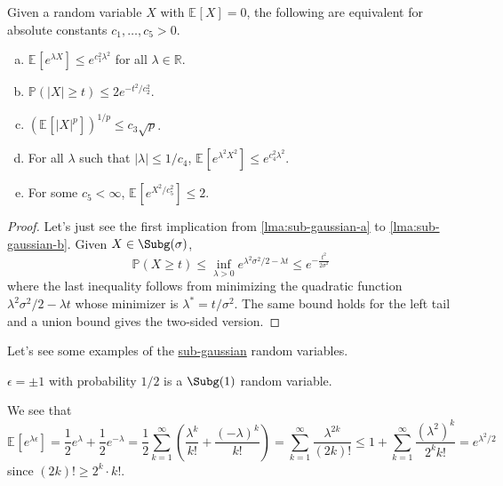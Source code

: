 \begin{lemma}\label{lma:sub-gaussian}
  Given a random variable \(X\) with \(\mathbb{E}_{}\left[X \right] =0\), the following are equivalent for absolute constants \(c_1, \dots , c_5 > 0\).
  \begin{enumerate}[(a)]
    \item\label{lma:sub-gaussian-a} \(\mathbb{E}_{}\left[e^{\lambda X} \right] \leq e^{c_1^2 \lambda ^2}\) for all \(\lambda \in \mathbb{R} \).
    \item\label{lma:sub-gaussian-b} \(\mathbb{P} (\vert X \vert \geq t) \leq 2 e^{- t^2 / c_2^2}\).
    \item\label{lma:sub-gaussian-c} \(\left( \mathbb{E}_{}\left[\vert X \vert ^p \right]  \right)^{1 / p} \leq c_3 \sqrt{p}  \).
    \item\label{lma:sub-gaussian-d} For all \(\lambda \) such that \(\vert \lambda  \vert \leq 1 / c_4 \), \(\mathbb{E}_{}\left[e^{\lambda ^2 X^2} \right] \leq e^{c_4^2 \lambda ^2} \).
    \item\label{lma:sub-gaussian-e} For some \(c_5 < \infty \), \(\mathbb{E}_{}\left[e^{X^2 / c_5^2}  \right] \leq 2\).
  \end{enumerate}
\end{lemma}
\begin{proof}
  Let's just see the first implication from \autoref{lma:sub-gaussian-a} to \autoref{lma:sub-gaussian-b}. Given \(X \in \Subg(\sigma ) \),
  \[
    \mathbb{P} (X\geq t) \leq \inf _{\lambda > 0} e^{\lambda ^2 \sigma ^2 / 2 - \lambda t} \leq e^{-\frac{t^2}{2\sigma ^2}}
  \]
  where the last inequality follows from minimizing the quadratic function \(\lambda ^{2} \sigma ^{2} / 2 - \lambda t\) whose minimizer is \(\lambda ^{\ast} = t / \sigma ^{2} \). The same bound holds for the left tail and a union bound gives the two-sided version.
\end{proof}

Let's see some examples of the \hyperref[def:sub-gaussian]{sub-gaussian} random variables.

\begin{eg}\label{eg:Rademacher-random-varaible}
  \(\epsilon = \pm 1\) with probability \(1 / 2\) is a \(\Subg(1) \) random variable.
\end{eg}
\begin{explanation}
  We see that
  \[
    \mathbb{E}_{}\left[e^{\lambda \epsilon } \right]
    = \frac{1}{2} e^\lambda + \frac{1}{2} e^{-\lambda }
    = \frac{1}{2} \sum_{k=1}^{\infty} \left( \frac{\lambda ^k}{k!} + \frac{(-\lambda )^k}{k!} \right)
    = \sum_{k=1}^{\infty} \frac{\lambda ^{2k}}{(2k)!}
    \leq 1 + \sum_{k=1}^{\infty} \frac{(\lambda ^2)^k}{2^k k!}
    = e^{\lambda ^2 / 2}
  \]
  since \((2k)! \geq 2^k \cdot k!\).
\end{explanation}


